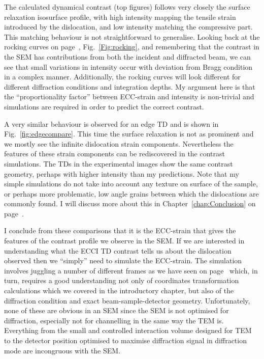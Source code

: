 The calculated dynamical contrast (top figures) follows very closely the surface relaxation isosurface profile, with high intensity mapping the tensile strain introduced by the dislocation, and low intensity matching the compressive part. This matching behaviour is not straightforward to generalise. Looking back at the rocking curves on page~\pageref{Fig:rocking}, Fig.~\ref{Fig:rocking}, and remembering that the contrast in the SEM has contributions from both the incident and diffracted beam, we can see that small variations in intensity occur with deviation from Bragg  condition in a complex manner. Additionally, the rocking curves will look different for different diffraction conditions and integration depths. My argument here is that the ``proportionality factor'' between ECC-strain and intensity is non-trivial and simulations are required in order to predict the correct contrast. 



A very similar behaviour is observed for an edge TD and is shown in Fig.~\ref{fig:edgecompare}. This time the surface relaxation is not as prominent and we mostly see the infinite dislocation strain components. Nevertheless the features of these strain components can be rediscovered in the contrast simulations. The TDs in the experimental images show the same contrast geometry, perhaps with higher intensity than my predictions. Note that my simple simulations do not take into account any texture on surface of the sample, or perhaps more problematic, low angle grains between which the dislocations are commonly found. I will discuss more about this in Chapter~\ref{chap:Conclusion} on page~\pageref{chap:Conclusion}.


I conclude from these comparisons that it is the ECC-strain that gives the features of the contrast profile we observe in the SEM. If we are interested in understanding what the ECCI TD contrast tells us about the dislocation observed then we ``simply'' need to simulate the ECC-strain. The simulation involves juggling a number of different frames as we have seen on page~\pageref{sec:coordinates} which, in turn, requires a good understanding not only of coordinates transformation calculations which we covered in the introductory chapter, but also of the diffraction condition and exact beam-sample-detector geometry. Unfortunately, none of these are obvious in an SEM since the SEM is not optimised for diffraction, especially not for channelling in the same way the TEM is. Everything from the small and controlled interaction volume designed for TEM to the detector position optimised to maximise diffraction signal in diffraction mode are incongruous with the SEM. 
 
